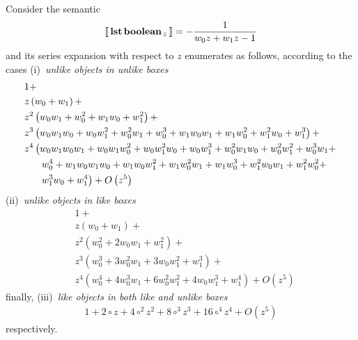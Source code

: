 \begin{example}
Consider the semantic
\begin{displaymath}
    \left\llbracket\,\textbf{lst}\,{\textbf{boolean}}_{\,z}\,\right\rrbracket = - \frac{1}{w_{0} z + w_{1} z - 1}
\end{displaymath}
and its series expansion with respect to $z$ enumerates as follows,
according to the cases (i)~\textit{unlike objects in unlike boxes}
\begin{displaymath}
\begin{split}
&1 + \\
&z \left(w_{0} + w_{1}\right) + \\
&z^{2} \left(w_{0} w_{1} + w_{0}^{2} + w_{1} w_{0} + w_{1}^{2}\right) + \\
&z^{3} \left(w_{0} w_{1} w_{0} + w_{0} w_{1}^{2} + w_{0}^{2} w_{1} + w_{0}^{3} + w_{1} w_{0} w_{1} + w_{1} w_{0}^{2} + w_{1}^{2} w_{0} + w_{1}^{3}\right) + \\
&z^{4} \left(w_{0} w_{1} w_{0} w_{1} + w_{0} w_{1} w_{0}^{2} + w_{0} w_{1}^{2} w_{0} + w_{0} w_{1}^{3} + w_{0}^{2} w_{1} w_{0} + w_{0}^{2} w_{1}^{2} + w_{0}^{3} w_{1} +\right.\\
&\indent\left.w_{0}^{4} + w_{1} w_{0} w_{1} w_{0} + w_{1} w_{0} w_{1}^{2} + w_{1} w_{0}^{2} w_{1} + w_{1} w_{0}^{3} + w_{1}^{2} w_{0} w_{1} + w_{1}^{2} w_{0}^{2} + \right.\\
&\indent\left.w_{1}^{3} w_{0} + w_{1}^{4}\right) + O\left(z^{5}\right)
\end{split}
\end{displaymath}
(ii)~\textit{unlike objects in like boxes}
\begin{displaymath}
\begin{split}
&1 + \\
&z \left(w_{0} + w_{1}\right) + \\
&z^{2} \left(w_{0}^{2} + 2 w_{0} w_{1} + w_{1}^{2}\right) + \\
&z^{3} \left(w_{0}^{3} + 3 w_{0}^{2} w_{1} + 3 w_{0} w_{1}^{2} + w_{1}^{3}\right) + \\
&z^{4} \left(w_{0}^{4} + 4 w_{0}^{3} w_{1} + 6 w_{0}^{2} w_{1}^{2} + 4 w_{0} w_{1}^{3} + w_{1}^{4}\right) + O\left(z^{5}\right)
\end{split}
\end{displaymath}
finally, (iii)~\textit{like objects in both like and unlike boxes}
\begin{displaymath}
\begin{split}
1 + 2 \circ z + 4 \circ^{2} z^{2} + 8 \circ^{3} z^{3} + 16 \circ^{4} z^{4} + O\left(z^{5}\right)
\end{split}
\end{displaymath}
respectively.
\end{example}

